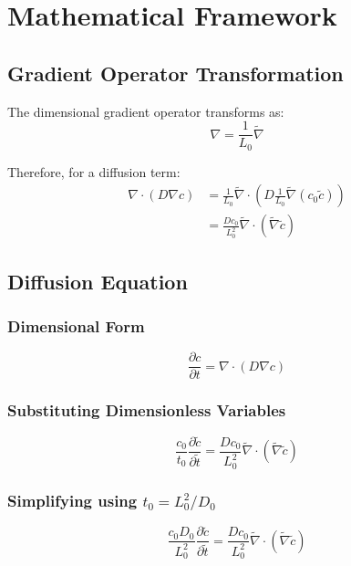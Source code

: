\documentclass[11pt,a4paper]{article}
\newcommand{\tildevar}[1]{\tilde{#1}}
\begin{document}
\section{Mathematical Framework}

\subsection{Gradient Operator Transformation}

The dimensional gradient operator transforms as:
\begin{equation}
\nabla = \frac{1}{L_0} \tildevar{\nabla}
\end{equation}

Therefore, for a diffusion term:
\begin{align}
\nabla \cdot (D \nabla c) &= \frac{1}{L_0} \tildevar{\nabla} \cdot \left( D \frac{1}{L_0} \tildevar{\nabla} (c_0 \tildevar{c}) \right) \\
&= \frac{D c_0}{L_0^2} \tildevar{\nabla} \cdot (\tildevar{\nabla} \tildevar{c})
\end{align}

\subsection{Diffusion Equation}

\subsubsection{Dimensional Form}
\begin{equation}
\frac{\partial c}{\partial t} = \nabla \cdot (D \nabla c)
\label{eq:diffusion_dim}
\end{equation}

\subsubsection{Substituting Dimensionless Variables}
\begin{equation}
\frac{c_0}{t_0} \frac{\partial \tildevar{c}}{\partial \tildevar{t}} = \frac{D c_0}{L_0^2} \tildevar{\nabla} \cdot (\tildevar{\nabla} \tildevar{c})
\end{equation}

\subsubsection{Simplifying using $t_0 = L_0^2/D_0$}
\begin{equation}
\frac{c_0 D_0}{L_0^2} \frac{\partial \tildevar{c}}{\partial \tildevar{t}} = \frac{D c_0}{L_0^2} \tildevar{\nabla} \cdot (\tildevar{\nabla} \tildevar{c})
\end{equation}
\end{document}
